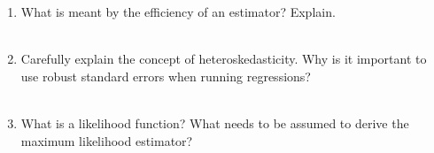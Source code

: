 \documentclass{article}
\begin{document}

\begin{enumerate}

    \item What is meant by the efficiency of an estimator? Explain. \\[1em]
\\[1em]

    \item Carefully explain the concept of heteroskedasticity. Why is it important to use robust standard errors when running regressions?\\[1em]
\\[1em]


    \item  What is a likelihood function? What needs to be assumed to derive the maximum likelihood estimator?\\[1em]
\end{enumerate}
\end{document}
